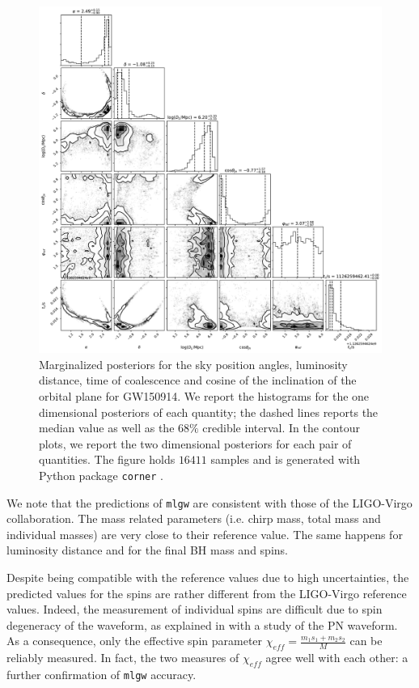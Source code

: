 \begin{figure}
	\centering
    \includegraphics[width=.75\linewidth, trim = {3cm 0cm 3cm 0cm}]{img/extrinsic.pdf}
	\caption{
Marginalized posteriors for the sky position angles, luminosity distance, time of coalescence and cosine of the inclination of the orbital plane for GW150914. We report the histograms for the one dimensional posteriors of each quantity; the dashed lines reports the median value as well as the $68\%$ credible interval.
In the contour plots, we report the two dimensional posteriors for each pair of quantities.
The figure holds $16411$ samples and is generated with Python package \texttt{corner} \cite{pycorner}.
}
	\label{fig:PDF_BBH_extrinsic}
\end{figure}
We note that the predictions of \texttt{mlgw} are consistent with those of the LIGO-Virgo collaboration.
The mass related parameters (i.e. chirp mass, total mass and individual masses) are very close to their reference value.
The same happens for luminosity distance and for the final BH mass and spins.
\par
Despite being compatible with the reference values due to high uncertainties, the predicted values for the spins are rather different from the LIGO-Virgo reference values.
Indeed, the measurement of individual spins are difficult due to spin degeneracy of the waveform, as explained in \cite{Baird2013spin_degeneracy} \cite{Purrer2015meas_spin_deg} with a study of the PN waveform.
As a consequence, only the effective spin parameter ${\chi_{eff} = \frac{m_1 s_1 + m_2 s_2}{M}}$ can be reliably measured.
In fact, the two measures of $\chi_{eff}$ agree well with each other: a further confirmation of \texttt{mlgw} accuracy.
